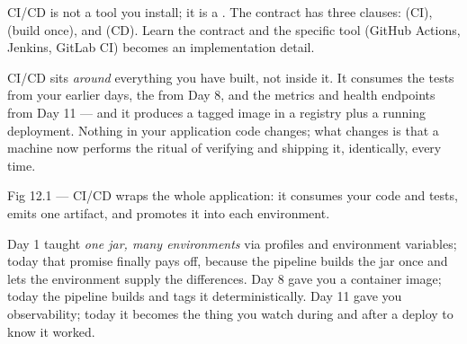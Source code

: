 \begin{keyidea}
CI/CD is not a tool you install; it is a . The contract has three clauses:  (CI),  (build once), and  (CD). Learn the contract and the specific tool (GitHub Actions, Jenkins, GitLab CI) becomes an implementation detail.
\end{keyidea}

 CI/CD sits \emph{around} everything you have built, not inside it. It consumes the tests from your earlier days, the  from Day 8, and the metrics and health endpoints from Day 11 --- and it produces a tagged image in a registry plus a running deployment. Nothing in your application code changes; what changes is that a machine now performs the ritual of verifying and shipping it, identically, every time.

\begin{wbfigure}{Fig 12.1 --- CI/CD wraps the whole application: it consumes your code and tests, emits one artifact, and promotes it into each environment.}
\end{wbfigure}

 Day 1 taught \emph{one jar, many environments} via profiles and environment variables; today that promise finally pays off, because the pipeline builds the jar once and lets the environment supply the differences. Day 8 gave you a container image; today the pipeline builds and tags it deterministically. Day 11 gave you observability; today it becomes the thing you watch during and after a deploy to know it worked.

